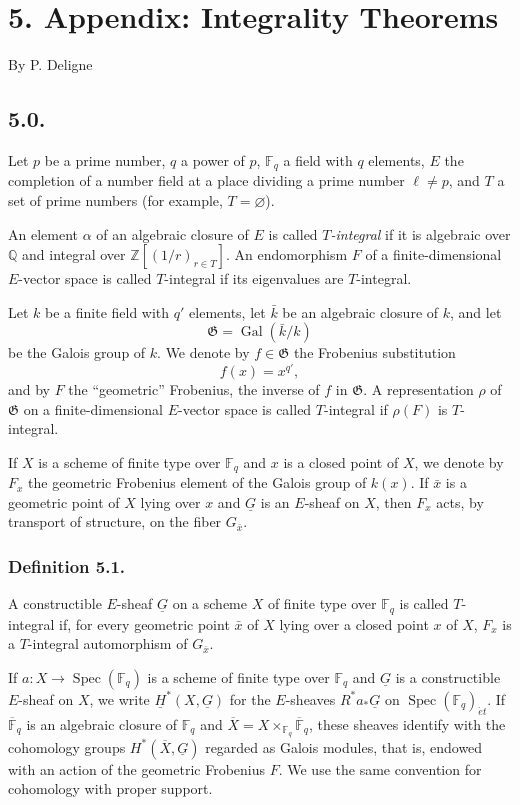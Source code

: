 \section*{5. Appendix: Integrality Theorems}

\begin{center}
By P. Deligne
\end{center}

\subsection*{5.0.}
Let $p$ be a prime number, $q$ a power of $p$, $\mathbb F_q$ a field with
$q$ elements, $E$ the completion of a number field at a place dividing a
prime number $\ell\ne p$, and $T$ a set of prime numbers (for example,
$T=\varnothing$).

An element $\alpha$ of an algebraic closure of $E$ is called
\emph{$T$-integral} if it is algebraic over $\mathbb Q$ and integral over
$\mathbb Z[(1/r)_{r\in T}]$.  An endomorphism $F$ of a finite-dimensional
$E$-vector space is called $T$-integral if its eigenvalues are $T$-integral.

Let $k$ be a finite field with $q'$ elements, let $\bar k$ be an algebraic
closure of $k$, and let
\[
\mathfrak G=\operatorname{Gal}(\bar k/k)
\]
be the Galois group of $k$.  We denote by $f\in\mathfrak G$ the Frobenius
substitution
\[
f(x)=x^{q'},
\]
and by $F$ the ``geometric'' Frobenius, the inverse of $f$ in $\mathfrak G$.
A representation $\rho$ of $\mathfrak G$ on a finite-dimensional
$E$-vector space is called $T$-integral if $\rho(F)$ is $T$-integral.

If $X$ is a scheme of finite type over $\mathbb F_q$ and $x$ is a closed
point of $X$, we denote by $F_x$ the geometric Frobenius element of the
Galois group of $k(x)$.  If $\bar x$ is a geometric point of $X$ lying over
$x$ and $\underline G$ is an $E$-sheaf on $X$, then $F_x$ acts, by transport
of structure, on the fiber $G_{\bar x}$.

\subsubsection*{Definition 5.1.}
A constructible $E$-sheaf $\underline G$ on a scheme $X$ of finite type over
$\mathbb F_q$ is called $T$-integral if, for every geometric point $\bar x$
of $X$ lying over a closed point $x$ of $X$, $F_x$ is a $T$-integral
automorphism of $G_{\bar x}$.

If $a:X\longrightarrow\operatorname{Spec}(\mathbb F_q)$ is a scheme of
finite type over $\mathbb F_q$ and $\underline G$ is a constructible
$E$-sheaf on $X$, we write $\underline H^*(X,\underline G)$ for the
$E$-sheaves $R^*a_*\underline G$ on
$\operatorname{Spec}(\mathbb F_q)_{\acute e t}$.  If
$\overline{\mathbb F}_q$ is an algebraic closure of $\mathbb F_q$ and
$\overline X=X\times_{\mathbb F_q}\overline{\mathbb F}_q$, these sheaves
identify with the cohomology groups $H^*(\overline X,\underline G)$ regarded
as Galois modules, that is, endowed with an action of the geometric
Frobenius $F$.  We use the same convention for cohomology with proper
support.


